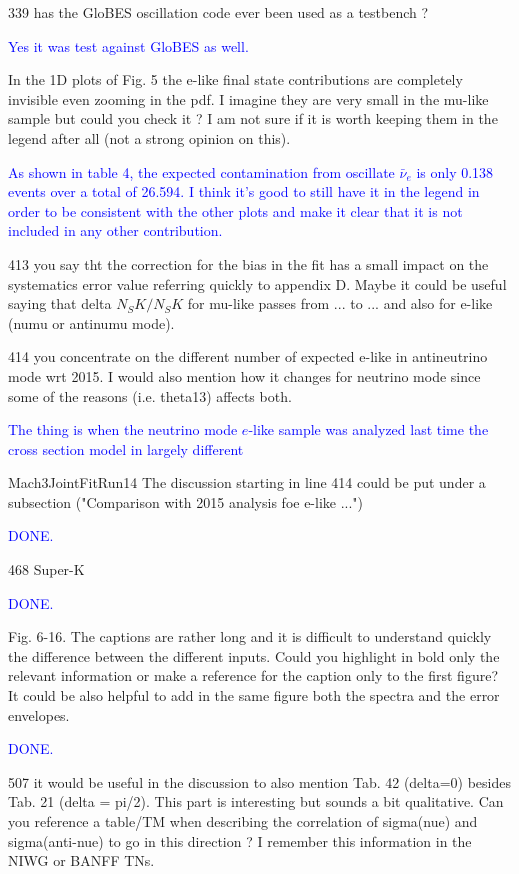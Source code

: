 \documentclass[final]{elsarticle}
\begin{document}
339 has the GloBES oscillation code ever been used as a testbench ?

\textcolor{blue}{Yes it was test against GloBES as well.}

In the 1D plots of Fig. 5 the e-like final state contributions are
completely invisible even zooming in the pdf. I imagine they are
very small in the mu-like sample but could you check it ? I am not
sure if it is worth keeping them in the legend after all (not
a strong opinion on this).

\textcolor{blue}{As shown in table 4, the expected contamination from oscillate $\bar{\nu}_e$ is only 0.138
events over a total of 26.594.
I think it's good to still have it in the legend in order to be consistent with the other plots
and make it clear that it is not included in any other contribution.}

413 you say tht the correction for the bias in the fit has a small
impact on the systematics error value referring quickly to appendix D.
Maybe it could be useful saying that delta $N_SK / N_SK$ for mu-like passes
from ... to ... and also for e-like (numu or antinumu mode).

414 you concentrate on the different number of expected e-like in antineutrino
mode wrt 2015. I would also mention how it changes for neutrino mode since
some of the reasons (i.e. theta13) affects both.

\textcolor{blue}{The thing is when the neutrino mode $e$-like sample
was analyzed last time the cross section model in largely different}

Mach3JointFitRun14
The discussion starting in line 414 could be put under a subsection
("Comparison with 2015 analysis foe e-like ...")

\textcolor{blue}{DONE.}

468 Super-K

\textcolor{blue}{DONE.}

Fig. 6-16. The captions are rather long and it is difficult to
understand quickly the difference between the different inputs. Could
you highlight in bold only the relevant information or make a
reference for the caption only to the first figure? It could be also
helpful to add in the same figure both the spectra and the error
envelopes.

\textcolor{blue}{DONE.}

507 it would be useful in the discussion to also mention Tab. 42
(delta=0) besides Tab. 21 (delta = pi/2). This part is interesting but
sounds a bit qualitative. Can you reference a table/TM when describing
the correlation of sigma(nue) and sigma(anti-nue) to go in this
direction ? I remember this information in the NIWG or BANFF TNs.
\end{document}
